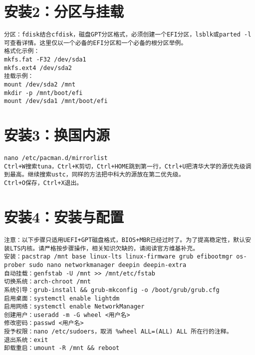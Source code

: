\documentclass[a4paper,fontset=fandol,zihao=-4,linespread=1.2]{ctexbook}
\begin{document}
\section{安装2：分区与挂载}
\begin{lstlisting}
分区：fdisk结合cfdisk，磁盘GPT分区格式，必须创建一个EFI分区，lsblk或parted -l可查看详情。这里仅以一个必备的EFI分区和一个必备的根分区举例。
格式化示例：
mkfs.fat -F32 /dev/sda1
mkfs.ext4 /dev/sda2
挂载示例：
mount /dev/sda2 /mnt
mkdir -p /mnt/boot/efi
mount /dev/sda1 /mnt/boot/efi
\end{lstlisting}

\section{安装3：换国内源}
\begin{lstlisting}
nano /etc/pacman.d/mirrorlist
Ctrl+W搜索tuna，Ctrl+K剪切，Ctrl+HOME跳到第一行，Ctrl+U把清华大学的源优先级调到最高。继续搜索ustc，同样的方法把中科大的源放在第二优先级。
Ctrl+O保存，Ctrl+X退出。
\end{lstlisting}

\section{安装4：安装与配置}
\begin{lstlisting}
注意：以下步骤只适用UEFI+GPT磁盘格式，BIOS+MBR已经过时了。为了提高稳定性，默认安装LTS内核。请严格按步骤操作，相关知识欠缺的，请阅读官方维基补充。
安装：pacstrap /mnt base linux-lts linux-firmware grub efibootmgr os-prober sudo nano networkmanager deepin deepin-extra
自动挂载：genfstab -U /mnt >> /mnt/etc/fstab
切换系统：arch-chroot /mnt
系统引导：grub-install && grub-mkconfig -o /boot/grub/grub.cfg
启用桌面：systemctl enable lightdm
启用网络：systemctl enable NetworkManager
创建用户：useradd -m -G wheel <用户名>
修改密码：passwd <用户名>
授予权限：nano /etc/sudoers，取消 %wheel ALL=(ALL) ALL 所在行的注释。
退出系统：exit
卸载重启：umount -R /mnt && reboot
\end{lstlisting}
\end{document}

